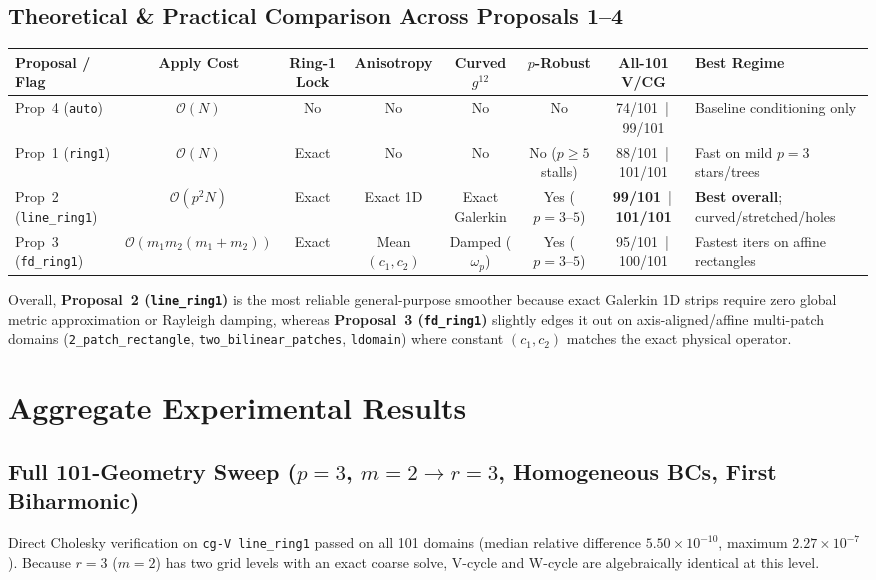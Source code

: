 \documentclass[10pt,a4paper]{article}
\begin{document}
\subsection{Theoretical & Practical Comparison Across Proposals 1--4}
\begin{center}
\scriptsize
\setlength{\tabcolsep}{3.5pt}
\begin{tabular}{@{}lccccccp{3.6cm}@{}}
\toprule
\textbf{Proposal / Flag} & \textbf{Apply Cost} & \textbf{Ring-1 Lock} & \textbf{Anisotropy} & \textbf{Curved $g^{12}$} & \textbf{$p$-Robust} & \textbf{All-101 V/CG} & \textbf{Best Regime} \\
\midrule
Prop~4 (\texttt{auto}) & $\mathcal{O}(N)$ & No & No & No & No & 74/101 \,|\, 99/101 & Baseline conditioning only \\
Prop~1 (\texttt{ring1}) & $\mathcal{O}(N)$ & Exact & No & No & No ($p\ge 5$ stalls) & 88/101 \,|\, 101/101 & Fast on mild $p=3$ stars/trees \\
Prop~2 (\texttt{line\_ring1}) & $\mathcal{O}(p^2 N)$ & Exact & Exact 1D & Exact Galerkin & Yes ($p=3\text{--}5$) & \textbf{99/101} \,|\, \textbf{101/101} & \textbf{Best overall}; curved/stretched/holes \\
Prop~3 (\texttt{fd\_ring1}) & $\mathcal{O}(m_1 m_2(m_1+m_2))$ & Exact & Mean $(c_1,c_2)$ & Damped ($\omega_p$) & Yes ($p=3\text{--}5$) & 95/101 \,|\, 100/101 & Fastest iters on affine rectangles \\
\bottomrule
\end{tabular}
\end{center}
Overall, \textbf{Proposal~2 (\texttt{line\_ring1})} is the most reliable general-purpose smoother because exact Galerkin 1D strips require zero global metric approximation or Rayleigh damping, whereas \textbf{Proposal~3 (\texttt{fd\_ring1})} slightly edges it out on axis-aligned/affine multi-patch domains (\texttt{2\_patch\_rectangle}, \texttt{two\_bilinear\_patches}, \texttt{ldomain}) where constant $(c_1, c_2)$ matches the exact physical operator.

\section{Aggregate Experimental Results}

\subsection{Full 101-Geometry Sweep ($p=3$, $m=2\to r=3$, Homogeneous BCs, First Biharmonic)}
Direct Cholesky verification on \texttt{cg-V line\_ring1} passed on all 101 domains (median relative difference $5.50\times 10^{-10}$, maximum $2.27\times 10^{-7}$). Because $r=3$ ($m=2$) has two grid levels with an exact coarse solve, V-cycle and W-cycle are algebraically identical at this level.
\end{document}
